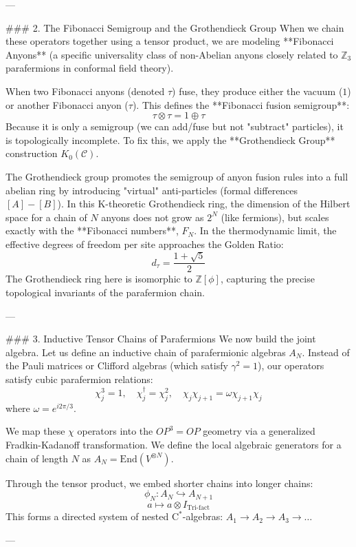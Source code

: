 ---

### 2. The Fibonacci Semigroup and the Grothendieck Group 
When we chain these operators together using a tensor product, we are modeling **Fibonacci Anyons** (a specific universality class of non-Abelian anyons closely related to $\mathbb{Z}_3$ parafermions in conformal field theory).

When two Fibonacci anyons (denoted $\tau$) fuse, they produce either the vacuum ($1$) or another Fibonacci anyon ($\tau$). This defines the **Fibonacci fusion semigroup**:
$$ \tau \otimes \tau = 1 \oplus \tau $$
Because it is only a semigroup (we can add/fuse but not "subtract" particles), it is topologically incomplete. To fix this, we apply the **Grothendieck Group** construction $K_0(\mathcal{C})$. 

The Grothendieck group promotes the semigroup of anyon fusion rules into a full abelian ring by introducing "virtual" anti-particles (formal differences $[A] - [B]$). 
In this K-theoretic Grothendieck ring, the dimension of the Hilbert space for a chain of $N$ anyons does not grow as $2^N$ (like fermions), but scales exactly with the **Fibonacci numbers**, $F_N$. In the thermodynamic limit, the effective degrees of freedom per site approaches the Golden Ratio:
$$ d_\tau = \frac{1 + \sqrt{5}}{2} $$
The Grothendieck ring here is isomorphic to $\mathbb{Z}[\phi]$, capturing the precise topological invariants of the parafermion chain.

---

### 3. Inductive Tensor Chains of Parafermions
We now build the joint algebra. Let us define an inductive chain of parafermionic algebras $A_N$. Instead of the Pauli matrices or Clifford algebras (which satisfy $\gamma^2 = 1$), our operators satisfy cubic parafermion relations:
$$ \chi_j^3 = 1, \quad \chi_j^\dagger = \chi_j^2, \quad \chi_j \chi_{j+1} = \omega \chi_{j+1} \chi_j $$
where $\omega = e^{i 2\pi/3}$. 

We map these $\chi$ operators into the $OP^3=OP$ geometry via a generalized Fradkin-Kadanoff transformation. We define the local algebraic generators for a chain of length $N$ as $A_N = \text{End}(V^{\otimes N})$. 

Through the tensor product, we embed shorter chains into longer chains:
$$ \phi_N: A_N \hookrightarrow A_{N+1} $$
$$ a \mapsto a \otimes I_{\text{Tri-fact}} $$
This forms a directed system of nested $\text{C}^*$-algebras: $A_1 \rightarrow A_2 \rightarrow A_3 \rightarrow \dots$

---

